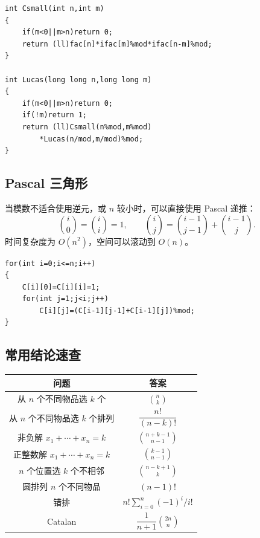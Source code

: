 \begin{verbatim}
int Csmall(int n,int m)
{
    if(m<0||m>n)return 0;
    return (ll)fac[n]*ifac[m]%mod*ifac[n-m]%mod;
}

int Lucas(long long n,long long m)
{
    if(m<0||m>n)return 0;
    if(!m)return 1;
    return (ll)Csmall(n%mod,m%mod)
        *Lucas(n/mod,m/mod)%mod;
}
\end{verbatim}

\subsection{Pascal 三角形}

当模数不适合使用逆元，或 $n$ 较小时，可以直接使用 Pascal 递推：
\[
    \binom{i}{0}=\binom{i}{i}=1,\qquad
    \binom{i}{j}=\binom{i-1}{j-1}+\binom{i-1}{j}.
\]
时间复杂度为 $O(n^2)$，空间可以滚动到 $O(n)$。

\begin{verbatim}
for(int i=0;i<=n;i++)
{
    C[i][0]=C[i][i]=1;
    for(int j=1;j<i;j++)
        C[i][j]=(C[i-1][j-1]+C[i-1][j])%mod;
}
\end{verbatim}

\subsection{常用结论速查}

\begin{center}
\begin{tabular}{c|c}
\hline
问题 & 答案 \\
\hline
从 $n$ 个不同物品选 $k$ 个 & $\binom{n}{k}$ \\
从 $n$ 个不同物品选 $k$ 个排列 & $\dfrac{n!}{(n-k)!}$ \\
非负解 $x_1+\cdots+x_n=k$ & $\binom{n+k-1}{n-1}$ \\
正整数解 $x_1+\cdots+x_n=k$ & $\binom{k-1}{n-1}$ \\
$n$ 个位置选 $k$ 个不相邻 & $\binom{n-k+1}{k}$ \\
圆排列 $n$ 个不同物品 & $(n-1)!$ \\
错排 & $n!\sum_{i=0}^{n}(-1)^i/i!$ \\
Catalan & $\dfrac{1}{n+1}\binom{2n}{n}$ \\
\hline
\end{tabular}
\end{center}
